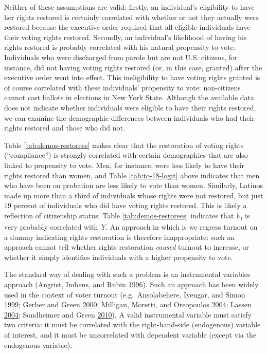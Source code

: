 \documentclass[12pt,]{article}
\begin{document}
Neither of these assumptions are valid: firstly, an individual's eligibility to have her rights restored is certainly correlated with whether or not they actually were restored because the executive order required that all eligible individuals have their voting rights restored. Secondly, an individual's likelihood of having his rights restored is probably correlated with his natural propensity to vote. Individuals who were discharged from parole but are not U.S. citizens, for instance, did not having voting rights restored (or, in this case, granted) after the executive order went into effect. This ineligibility to have voting rights granted is of course correlated with these individuals' propensity to vote: non-citizens cannot cast ballots in elections in New York State. Although the available data does not indicate whether individuals were eligible to have their rights restored, we can examine the demographic differences between individuals who had their rights restored and those who did not.



Table \ref{tab:demos-restorees} makes clear that the restoration of voting rights (``compliance'') is strongly correlated with certain demographics that are also linked to propensity to vote. Men, for instance, were less likely to have their rights restored than women, and Table \ref{tab:to-18-logit} above indicates that men who have been on probation are less likely to vote than women. Similarly, Latinos made up more than a third of individuals whose rights were not restored, but just 19 percent of individuals who did have voting rights restored. This is likely a reflection of citizenship status. Table \ref{tab:demos-restorees} indicates that \emph{b\textsubscript{1}} is very probably correlated with \emph{Y}. An approach in which is we regress turnout on a dummy indicating rights restoration is therefore inappropriate: such an approach cannot tell whether rights restoration \emph{caused} turnout to increase, or whether it simply identifies individuals with a higher propensity to vote.

The standard way of dealing with such a problem is an instrumental variables approach (Angrist, Imbens, and Rubin \protect\hyperlink{ref-Angrist1996}{1996}). Such an approach has been widely used in the context of voter turnout (e.g.~Ansolabehere, Iyengar, and Simon \protect\hyperlink{ref-Ansolabehere1999}{1999}; Gerber and Green \protect\hyperlink{ref-Gerber2000}{2000}; Milligan, Moretti, and Oreopoulos \protect\hyperlink{ref-Milligan2004}{2004}; Lassen \protect\hyperlink{ref-Lassen2004}{2004}; Sondheimer and Green \protect\hyperlink{ref-Sondheimer2010}{2010}). A valid instrumental variable must satisfy two criteria: it must be correlated with the right-hand-side (endogenous) variable of interest, and it must be uncorrelated with dependent variable (except via the endogenous variable).
\end{document}
